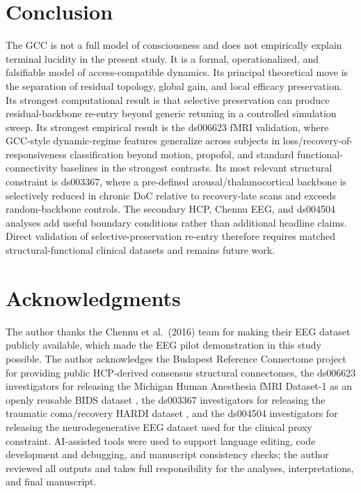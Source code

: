 \documentclass[11pt,a4paper]{article}
\theoremstyle{plain}
\theoremstyle{definition}
\theoremstyle{remark}
\begin{document}
\section{Conclusion}
\label{sec:schluss}

The GCC is not a full model of consciousness and does not empirically explain terminal lucidity in the present study. It is a formal, operationalized, and falsifiable model of access-compatible dynamics. Its principal theoretical move is the separation of residual topology, global gain, and local efficacy preservation. Its strongest computational result is that selective preservation can produce residual-backbone re-entry beyond generic retuning in a controlled simulation sweep. Its strongest empirical result is the ds006623 fMRI validation, where GCC-style dynamic-regime features generalize across subjects in loss/recovery-of-responsiveness classification beyond motion, propofol, and standard functional-connectivity baselines in the strongest contrasts. Its most relevant structural constraint is ds003367, where a pre-defined arousal/thalamocortical backbone is selectively reduced in chronic DoC relative to recovery-late scans and exceeds random-backbone controls. The secondary HCP, Chennu EEG, and ds004504 analyses add useful boundary conditions rather than additional headline claims. Direct validation of selective-preservation re-entry therefore requires matched structural-functional clinical datasets and remains future work.


\newpage
\section*{Acknowledgments}

The author thanks the Chennu et al.\ (2016) team for making their EEG dataset publicly available, which made the EEG pilot demonstration in this study possible. The author acknowledges the Budapest Reference Connectome project for providing public HCP-derived consensus structural connectomes, the ds006623 investigators for releasing the Michigan Human Anesthesia fMRI Dataset-1 as an openly reusable BIDS dataset \citep{huang2026,huangopenneuro2025}, the ds003367 investigators for releasing the traumatic coma/recovery HARDI dataset \citep{snider2020,snideropenneuro2020}, and the ds004504 investigators for releasing the neurodegenerative EEG dataset used for the clinical proxy constraint.
AI-assisted tools were used to support language editing, code development and debugging, and manuscript consistency checks; the author reviewed all outputs and takes full responsibility for the analyses, interpretations, and final manuscript.
\end{document}
